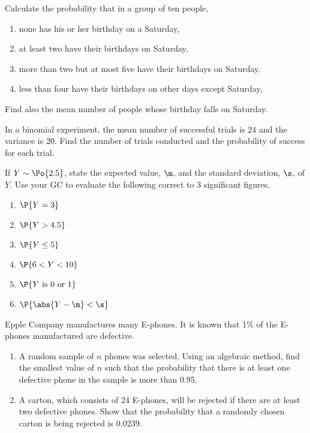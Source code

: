 \begin{problem}
    Calculate the probability that in a group of ten people,
    \begin{enumerate}
        \item none has his or her birthday on a Saturday,
        \item at least two have their birthdays on Saturday,
        \item more than two but at most five have their birthdays on Saturday.
        \item less than four have their birthdays on other days except Saturday,
    \end{enumerate}
    Find also the mean number of people whose birthday falls on Saturday.
\end{problem}

\begin{problem}
    In a binomial experiment, the mean number of successful trials is 24 and the variance is 20. Find the number of trials conducted and the probability of success for each trial.
\end{problem}

\begin{problem}
    If $Y \sim \Po{2.5}$, state the expected value, $\m$, and the standard deviation, $\s$, of $Y$. Use your GC to evaluate the following correct to 3 significant figures.
    \begin{enumerate}
        \item $\P{Y = 3}$
        \item $\P{Y > 4.5}$
        \item $\P{Y \leq 5}$
        \item $\P{6 < Y < 10}$
        \item $\P{Y \text{ is 0 or 1}}$
        \item $\P{\abs{Y - \m} < \s}$
    \end{enumerate}
\end{problem}

\begin{problem}
    Epple Company manufactures many E-phones. It is known that 1\% of the E-phones manufactured are defective.
    \begin{enumerate}
        \item A random sample of $n$ phones was selected. Using an algebraic method, find the smallest value of $n$ such that the probability that there is at least one defective phone in the sample is more than 0.95.
        \item A carton, which consists of 24 E-phones, will be rejected if there are at least two defective phones. Show that the probability that a randomly chosen carton is being rejected is 0.0239.
    \end{enumerate}
\end{problem}

